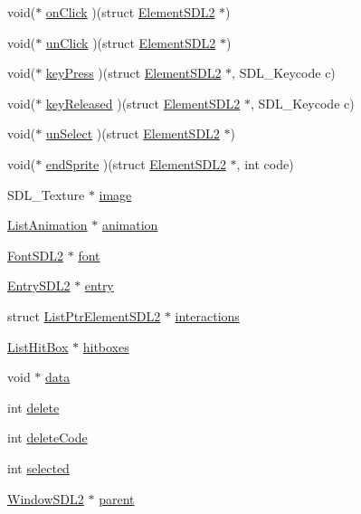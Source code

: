 \begin{DoxyCompactItemize}
void($\ast$ \hyperlink{structElementSDL2_ae56c022599e2e8acdda29fbb8af44942}{on\+Click} )(struct \hyperlink{structElementSDL2}{Element\+S\+D\+L2} $\ast$)
\item 
void($\ast$ \hyperlink{structElementSDL2_a0ad4094686063db36244b474fe42a336}{un\+Click} )(struct \hyperlink{structElementSDL2}{Element\+S\+D\+L2} $\ast$)
\item 
void($\ast$ \hyperlink{structElementSDL2_aff1dc935700d44a0ef0d53de7cca9d41}{key\+Press} )(struct \hyperlink{structElementSDL2}{Element\+S\+D\+L2} $\ast$, S\+D\+L\+\_\+\+Keycode c)
\item 
void($\ast$ \hyperlink{structElementSDL2_a76ecf85adcb072db772a8351ea7e04ee}{key\+Released} )(struct \hyperlink{structElementSDL2}{Element\+S\+D\+L2} $\ast$, S\+D\+L\+\_\+\+Keycode c)
\item 
void($\ast$ \hyperlink{structElementSDL2_a8057ee0d19cdd60ec568076206ee0e12}{un\+Select} )(struct \hyperlink{structElementSDL2}{Element\+S\+D\+L2} $\ast$)
\item 
void($\ast$ \hyperlink{structElementSDL2_aa857e06629320966e80bd437050b07e8}{end\+Sprite} )(struct \hyperlink{structElementSDL2}{Element\+S\+D\+L2} $\ast$, int code)
\item 
S\+D\+L\+\_\+\+Texture $\ast$ \hyperlink{structElementSDL2_aab2ff0fd3a1c4370d7f1f9cdd250d056}{image}
\item 
\hyperlink{structListAnimation}{List\+Animation} $\ast$ \hyperlink{structElementSDL2_a9b7927abbd7b67f843758ff65436fbb5}{animation}
\item 
\hyperlink{structFontSDL2}{Font\+S\+D\+L2} $\ast$ \hyperlink{structElementSDL2_a0379d0d8d499b3916a191b65f2d23f3d}{font}
\item 
\hyperlink{structEntrySDL2}{Entry\+S\+D\+L2} $\ast$ \hyperlink{structElementSDL2_a9c99c1c34dcf0e52baaca7a64598bd8a}{entry}
\item 
struct \hyperlink{structListPtrElementSDL2}{List\+Ptr\+Element\+S\+D\+L2} $\ast$ \hyperlink{structElementSDL2_aca39f22199862196fc52dfcecafeca4a}{interactions}
\item 
\hyperlink{structListHitBox}{List\+Hit\+Box} $\ast$ \hyperlink{structElementSDL2_aa4af7ab8949d93544da609659a4011c0}{hitboxes}
\item 
void $\ast$ \hyperlink{structElementSDL2_abca7de78cc7e420d98d24a955563c7cc}{data}
\item 
int \hyperlink{structElementSDL2_a59d6b7086533d8d7da883bc882c4ef6d}{delete}
\item 
int \hyperlink{structElementSDL2_a1f8620d697afd711263d20dd82077cd0}{delete\+Code}
\item 
int \hyperlink{structElementSDL2_a2cae92fe5dd207db485261128b82bc02}{selected}
\item 
\hyperlink{structWindowSDL2}{Window\+S\+D\+L2} $\ast$ \hyperlink{structElementSDL2_a9cd0b68349b49321423bec3136cf7e6e}{parent}
\end{DoxyCompactItemize}



